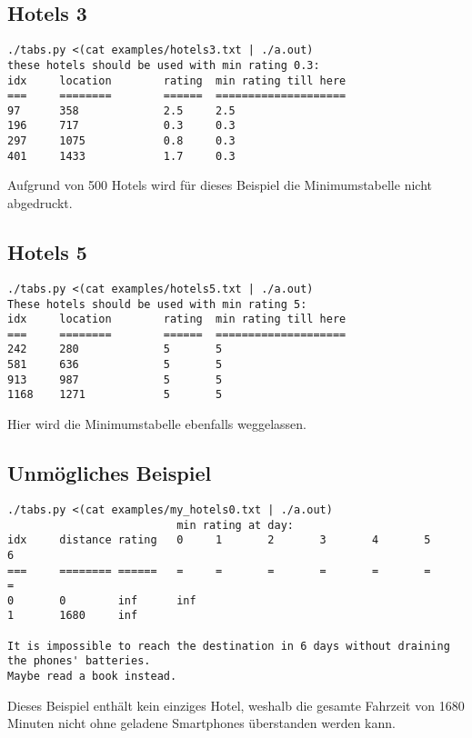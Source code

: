 \documentclass[a4paper,10pt,ngerman]{scrartcl}
\begin{document}
\subsection*{Hotels 3}
\begin{lstlisting}
./tabs.py <(cat examples/hotels3.txt | ./a.out)
these hotels should be used with min rating 0.3:
idx     location        rating  min rating till here
===     ========        ======  ====================
97      358             2.5     2.5
196     717             0.3     0.3
297     1075            0.8     0.3
401     1433            1.7     0.3
\end{lstlisting}
Aufgrund von 500 Hotels wird für dieses Beispiel die Minimumstabelle nicht abgedruckt.

\subsection*{Hotels 5}
\begin{lstlisting}
./tabs.py <(cat examples/hotels5.txt | ./a.out)
These hotels should be used with min rating 5:
idx     location        rating  min rating till here
===     ========        ======  ====================
242     280             5       5
581     636             5       5
913     987             5       5
1168    1271            5       5
\end{lstlisting}
Hier wird die Minimumstabelle ebenfalls weggelassen.

\subsection*{Unmögliches Beispiel}
\begin{lstlisting}
./tabs.py <(cat examples/my_hotels0.txt | ./a.out)
                          min rating at day:
idx     distance rating   0     1       2       3       4       5       6
===     ======== ======   =     =       =       =       =       =       =
0       0        inf      inf
1       1680     inf

It is impossible to reach the destination in 6 days without draining the phones' batteries.
Maybe read a book instead.
\end{lstlisting}
Dieses Beispiel enthält kein einziges Hotel, weshalb die gesamte Fahrzeit von 1680 Minuten nicht ohne geladene Smartphones überstanden werden kann.
\end{document}

